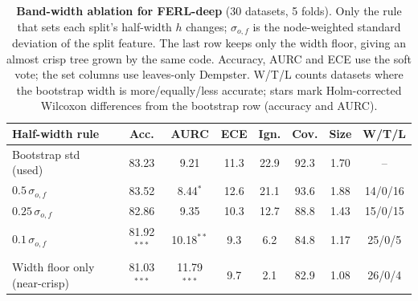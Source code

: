 \begin{table}[t]
\centering
\footnotesize
\setlength{\tabcolsep}{3pt}
\caption{\textbf{Band-width ablation for FERL-deep} (30 datasets, 5 folds). Only the rule that sets each split's half-width $h$ changes; $\sigma_{o,f}$ is the node-weighted standard deviation of the split feature. The last row keeps only the width floor, giving an almost crisp tree grown by the same code. Accuracy, AURC and ECE use the soft vote; the set columns use leaves-only Dempster. W/T/L counts datasets where the bootstrap width is more/equally/less accurate; stars mark Holm-corrected Wilcoxon differences from the bootstrap row (accuracy and AURC).}
\label{tab:width-ablation}
\begin{tabular}{@{}lccccccc@{}}
\toprule
Half-width rule & Acc. & AURC & ECE & Ign. & Cov. & Size & W/T/L\\
\midrule
Bootstrap std (used) & 83.23 & 9.21 & 11.3 & 22.9 & 92.3 & 1.70 & --\\
$0.5\,\sigma_{o,f}$ & 83.52 & 8.44$^{*}$ & 12.6 & 21.1 & 93.6 & 1.88 & 14/0/16\\
$0.25\,\sigma_{o,f}$ & 82.86 & 9.35 & 10.3 & 12.7 & 88.8 & 1.43 & 15/0/15\\
$0.1\,\sigma_{o,f}$ & 81.92$^{***}$ & 10.18$^{**}$ & 9.3 & 6.2 & 84.8 & 1.17 & 25/0/5\\
Width floor only (near-crisp) & 81.03$^{***}$ & 11.79$^{***}$ & 9.7 & 2.1 & 82.9 & 1.08 & 26/0/4\\
\bottomrule
\end{tabular}
\end{table}

